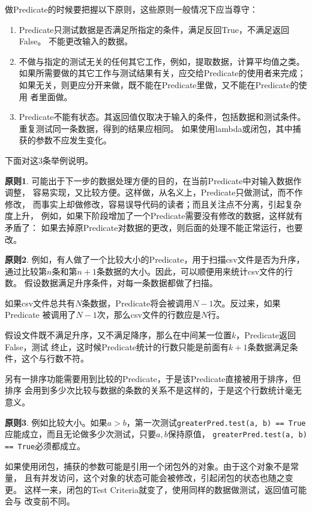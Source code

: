 \documentclass[11pt]{article}
\newcommand{\id}[1]{\texttt{#1}}
\begin{document}
做Predicate的时候要把握以下原则，这些原则一般情况下应当尊守：
\begin{enumerate}
  \item Predicate只测试数据是否满足所指定的条件，满足反回True，不满足返回False。
    不能更改输入的数据。

  \item 不做与指定的测试无关的任何其它工作，例如，提取数据，计算平均值之类。
    如果所需要做的其它工作与测试结果有关，应交给Predicate的使用者来完成；
    如果无关，则更应分开来做，既不能在Predicate里做，又不能在Predicate的使用
    者里面做。

  \item Predicate不能有状态。其返回值仅取决于输入的条件，包括数据和测试条件。
    重复测试同一条数据，得到的结果应相同。
    如果使用lambda或闭包，其中捕获的参数不应发生变化。
 
\end{enumerate}

下面对这3条举例说明。

{\bf 原则1}. 可能出于下一步的数据处理方便的目的，在当前Predicate中对输入数据作调整，
容易实现，又比较方便。这样做，从名义上，Predicate只做测试，而不作修改，
而事实上却做修改，容易误导代码的读者；而且关注点不分离，引起复杂度上升，
例如，如果下阶段增加了一个Predicate需要没有修改的数据，这样就有矛盾了：
如果去掉原Predicate对数据的更改，则后面的处理不能正常运行，也要改。

{\bf 原则2}. 例如，有人做了一个比较大小的Predicate，用于扫描csv文件是否为升序，
通过比较第$n$条和第$n+1$条数据的大小。因此，可以顺便用来统计csv文件的行数。
假设数据满足升序条件，对每一条数据都做了扫描。

如果csv文件总共有$N$条数据，Predicate将会被调用$N-1$次。反过来，如果Predicate
被调用了$N-1$次，那么csv文件的行数应是$N$行。

假设文件既不满足升序，又不满足降序，那么在中间某一位置$k$，Predicate返回False，测试
终止，这时候Predicate统计的行数只能是前面有$k+1$条数据满足条件，这个与行数不符。

另有一排序功能需要用到比较的Predicate，于是该Predicate直接被用于排序，但排序
会用到多少次比较与数据的条数的关系不是这样的，于是这个行数统计毫无意义。

{\bf 原则3}. 例如比较大小。如果$a > b$，第一次测试\id{greaterPred.test(a, b) == True}
应能成立，而且无论做多少次测试，只要$a, b$保持原值，
\id{greaterPred.test(a, b) == True}必须都成立。

如果使用闭包，捕获的参数可能是引用一个闭包外的对象。由于这个对象不是常量，
且有并发访问，这个对象的状态可能会被修改，引起闭包的状态也随之变更。
这样一来，闭包的Test Criteria就变了，使用同样的数据做测试，返回值可能会与
改变前不同。
    
\end{document}
